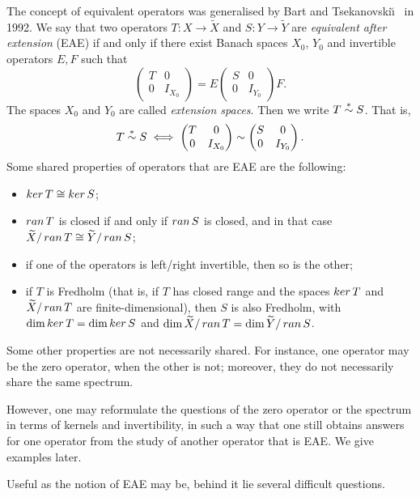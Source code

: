 \documentclass[10pt,a4paper]{amsart}
\def\beq{\begin{equation}}
\def\eeq{\end{equation}}
\def\wX{\widetilde X}
\def\wY{\widetilde Y}
\def\ker{\mathop{\rm ker}\nolimits}
\def\ran{\mathop{\rm ran}\nolimits}
\newcommand{\simast}{%
    \ensuremath{%
       \stackrel{\mathsf{\ast}}{\sim}}}
\begin{document}
The concept of equivalent operators was generalised by Bart and Tseka\-novski\u\i~\cite{BTsk} in 1992. We say that two operators $T: X \to \wX$ and $S:Y \to \wY$ are
{\em equivalent after extension\/} (EAE) if and only if there exist Banach spaces $X_0$, $Y_0$
and invertible operators $E,F$ such that
\beq\label{eq:8}
\begin{pmatrix}
T & 0 \\ 0 & I_{X_0}
\end{pmatrix} = 
E
\begin{pmatrix}
S & 0 \\ 0 & I_{Y_0}
\end{pmatrix}
F.
\eeq
The spaces $X_0$ and $Y_0$ are called {\em extension spaces}. Then we write $T \simast S$.
That is,
\[ T \simast S \iff \begin{pmatrix}
T & 0 \\ 0 & I_{X_0}
\end{pmatrix} \sim
\begin{pmatrix}
S & 0 \\ 0 & I_{Y_0}
\end{pmatrix}.
\]
Some shared properties of operators that are EAE are the following:
\begin{itemize}
\item $\ker T \cong \ker S$;
\item $\ran T$ is closed if and only if $\ran S$ is closed, and in that case\\
$\wX/\ran T \cong \wY/\ran S$;
\item if one of the operators is left/right invertible, then so is the other;
\item if $T$ is Fredholm  (that is, if $T$  has closed range and
the spaces   
$\ker T$ and $\wX/\ran T$ are finite-dimensional), then  $S$ is also Fredholm, with $\dim \ker T=\dim \ker S$
and $\dim \wX/\ran T = \dim  \wY/\ran S$.
\end{itemize}
Some other properties are not necessarily shared.
For instance, one operator may be the zero operator, when the other is not; 
moreover, they do not necessarily share the same spectrum.

However, one may reformulate the questions of the zero operator or 
the spectrum in terms of kernels and invertibility, in such a way that one still obtains
answers for one operator from the study of another operator that is EAE. We give examples later.

Useful as the notion of EAE may be, behind it lie several difficult questions.\\
\end{document}

